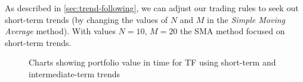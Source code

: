 As described in \ref{sec:trend-following}, we can adjust our trading rules to seek out short-term trends
 (by changing the values of $N$ and $M$ in the \emph{Simple Moving Average} method).
With values $N = 10$, $M = 20$ the SMA method focused on short-term trends.
 

  

\begin{figure}[htb]
  \caption{Charts showing portfolio value in time for TF using short-term and intermediate-term trends}
\label{fig:TF}
\end{figure}


